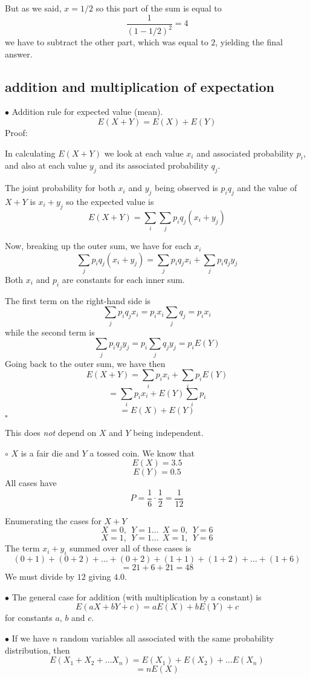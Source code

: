 \documentclass[11pt, oneside]{article}   	%
\begin{document}
But as we said, $ x= 1/2$ so this part of the sum is equal to
\[ \frac{1}{(1-1/2)^2} = 4 \]
we have to subtract the other part, which was equal to $2$, yielding the final answer.

\subsection*{addition and multiplication of expectation}
$\bullet$ Addition rule for expected value (mean).
\[ E(X + Y) = E(X) + E(Y) \]
Proof:

In calculating $E(X + Y)$ we look at each value $x_i$ and associated probability $p_i$, and also at each value $y_j$ and its associated probability $q_j$.

The joint probability for both $x_i$ and $y_j$ being observed is $p_i q_j$ and the value of $X + Y$ is $x_i + y_j$ so the expected value is
\[ E(X + Y) = \sum_i \sum_j p_i q_j (x_i + y_j) \]

Now, breaking up the outer sum, we have for each $x_i$
\[ \sum_j p_i q_j (x_i + y_j) =  \sum_j p_i q_j x_i  +  \sum_j p_i q_j y_j \]
Both $x_i$ and $p_i$ are constants for each inner sum.

The first term on the right-hand side is
\[  \sum_j p_i q_j x_i = p_i  x_i \sum_j q_j = p_i x_i \]
while the second term is
\[ \sum_j p_i q_j y_j = p_i \sum_j q_j y_j = p_i E(Y) \]
Going back to the outer sum, we have then
\[ E(X + Y) = \sum_i p_i x_i + \sum_i  p_i E(Y) \]
\[ = \sum_i p_i x_i + E(Y) \sum_i  p_i \]
\[ = E(X) + E(Y) \]
$\square$

This does \emph{not} depend on $X$ and $Y$ being independent.

$\circ$ $X$ is a fair die and $Y$ a tossed coin.  We know that 
\[ E(X) = 3.5 \] 
\[ E(Y) = 0.5 \]
All cases have
\[ P = \frac{1}{6} \cdot \frac{1}{2} = \frac{1}{12} \]

Enumerating the cases for $X + Y$
\[ X = 0, \ \ Y = 1 \dots \ \  X = 0, \ \ Y = 6 \]
\[ X = 1, \ \ Y = 1 \dots \ \  X = 1, \ \ Y = 6 \]
The term $x_i + y_i$ summed over all of these cases is 
\[ (0 + 1) + (0 + 2) + \dots + (0 + 2) + (1 + 1) + (1 + 2) + \dots + (1 + 6) \]
\[ = 21 + 6 + 21 = 48 \]
We must divide by $12$ giving $4.0$.

$\bullet$ The general case for addition (with multiplication by a constant) is
\[ E(aX + bY + c) = aE(X) + bE(Y) + c \]
for constants $a$, $b$ and $c$.

$\bullet$ If we have $n$ random variables all associated with the same probability distribution, then
\[ E(X_1 + X_2 + \dots X_n) = E(X_1) + E(X_2) + \dots E(X_n) \]
\[ = n E(X) \]
\end{document}
